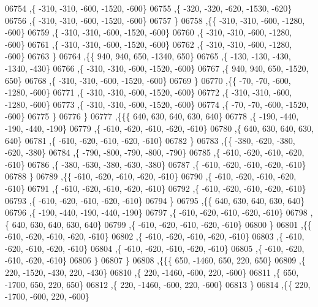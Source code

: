 \begin{DoxyCode}
06754     ,\{  -310,  -310,  -600, -1520,  -600\}
06755     ,\{  -320,  -320,  -620, -1530,  -620\}
06756     ,\{  -310,  -310,  -600, -1520,  -600\}
06757     \}
06758    ,\{\{  -310,  -310,  -600, -1280,  -600\}
06759     ,\{  -310,  -310,  -600, -1520,  -600\}
06760     ,\{  -310,  -310,  -600, -1280,  -600\}
06761     ,\{  -310,  -310,  -600, -1520,  -600\}
06762     ,\{  -310,  -310,  -600, -1280,  -600\}
06763     \}
06764    ,\{\{   940,   940,   650, -1340,   650\}
06765     ,\{  -130,  -130,  -430, -1340,  -430\}
06766     ,\{  -310,  -310,  -600, -1520,  -600\}
06767     ,\{   940,   940,   650, -1520,   650\}
06768     ,\{  -310,  -310,  -600, -1520,  -600\}
06769     \}
06770    ,\{\{   -70,   -70,  -600, -1280,  -600\}
06771     ,\{  -310,  -310,  -600, -1520,  -600\}
06772     ,\{  -310,  -310,  -600, -1280,  -600\}
06773     ,\{  -310,  -310,  -600, -1520,  -600\}
06774     ,\{   -70,   -70,  -600, -1520,  -600\}
06775     \}
06776    \}
06777   ,\{\{\{   640,   630,   640,   630,   640\}
06778     ,\{  -190,  -440,  -190,  -440,  -190\}
06779     ,\{  -610,  -620,  -610,  -620,  -610\}
06780     ,\{   640,   630,   640,   630,   640\}
06781     ,\{  -610,  -620,  -610,  -620,  -610\}
06782     \}
06783    ,\{\{  -380,  -620,  -380,  -620,  -380\}
06784     ,\{  -790,  -800,  -790,  -800,  -790\}
06785     ,\{  -610,  -620,  -610,  -620,  -610\}
06786     ,\{  -380,  -630,  -380,  -630,  -380\}
06787     ,\{  -610,  -620,  -610,  -620,  -610\}
06788     \}
06789    ,\{\{  -610,  -620,  -610,  -620,  -610\}
06790     ,\{  -610,  -620,  -610,  -620,  -610\}
06791     ,\{  -610,  -620,  -610,  -620,  -610\}
06792     ,\{  -610,  -620,  -610,  -620,  -610\}
06793     ,\{  -610,  -620,  -610,  -620,  -610\}
06794     \}
06795    ,\{\{   640,   630,   640,   630,   640\}
06796     ,\{  -190,  -440,  -190,  -440,  -190\}
06797     ,\{  -610,  -620,  -610,  -620,  -610\}
06798     ,\{   640,   630,   640,   630,   640\}
06799     ,\{  -610,  -620,  -610,  -620,  -610\}
06800     \}
06801    ,\{\{  -610,  -620,  -610,  -620,  -610\}
06802     ,\{  -610,  -620,  -610,  -620,  -610\}
06803     ,\{  -610,  -620,  -610,  -620,  -610\}
06804     ,\{  -610,  -620,  -610,  -620,  -610\}
06805     ,\{  -610,  -620,  -610,  -620,  -610\}
06806     \}
06807    \}
06808   ,\{\{\{   650, -1460,   650,   220,   650\}
06809     ,\{   220, -1520,  -430,   220,  -430\}
06810     ,\{   220, -1460,  -600,   220,  -600\}
06811     ,\{   650, -1700,   650,   220,   650\}
06812     ,\{   220, -1460,  -600,   220,  -600\}
06813     \}
06814    ,\{\{   220, -1700,  -600,   220,  -600\}

\end{DoxyCode}
